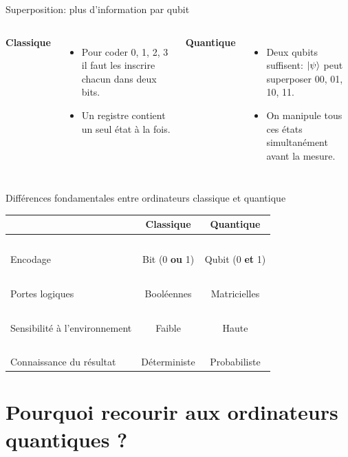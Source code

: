 \documentclass[aspectratio=169,12pt]{beamer}
\begin{document}
\begin{frame}{Superposition: plus d'information par qubit}
  \begin{columns}[T,onlytextwidth]
    \textbf{Classique}\\
    \begin{itemize}
      \item Pour coder 0, 1, 2, 3 il faut les inscrire chacun dans deux bits.
      \item Un registre contient un seul état à la fois.
    \end{itemize}
    \textbf{Quantique}\\
    \begin{itemize}
      \item Deux qubits suffisent: $\ket{\psi}$ peut superposer 00, 01, 10, 11.
      \item On manipule tous ces états simultanément avant la mesure.
    \end{itemize}
  \end{columns}
\end{frame}

\begin{frame}{Différences fondamentales entre ordinateurs classique et quantique}
  \centering
  \begin{tabular}{l|c|c}
    & Classique & Quantique \\\hline
    ~& ~ & ~\\
    Encodage & Bit (0 \textbf{ou} 1) & Qubit (0 \textbf{et} 1) \\
     ~& ~ & ~\\
    Portes logiques & Booléennes & Matricielles \\
    ~& ~ & ~\\
    Sensibilité à l'environnement & Faible & Haute \\
    ~& ~ & ~\\
    Connaissance du résultat & Déterministe & Probabiliste \\
  \end{tabular}
\end{frame}

\section{Pourquoi recourir aux ordinateurs quantiques ?}
\end{document}
